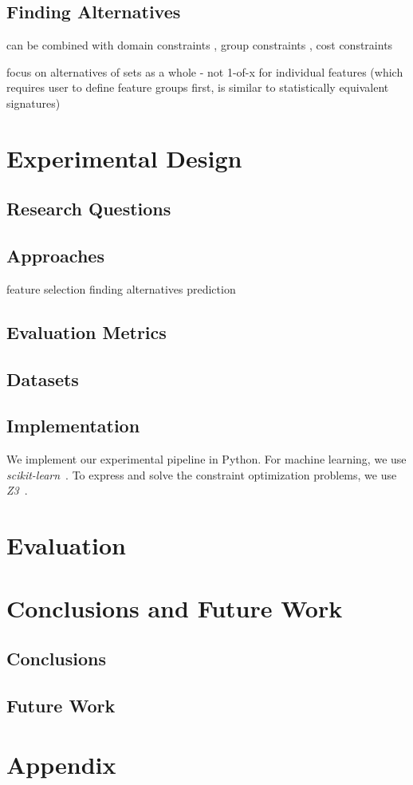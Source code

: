 \documentclass{article}
\begin{document}
\subsection{Finding Alternatives}

can be combined with domain constraints \cite{groves2015toward}, group constraints \cite{yuan2006model}, cost constraints \cite{paclik2002feature}

focus on alternatives of sets as a whole - not 1-of-x for individual features (which requires user to define feature groups first, is similar to statistically equivalent signatures)

\section{Experimental Design}
\label{sec:experimental-design}

\subsection{Research Questions}

\subsection{Approaches}

feature selection
finding alternatives
prediction

\subsection{Evaluation Metrics}

\subsection{Datasets}

\subsection{Implementation}

We implement our experimental pipeline in Python.
For machine learning, we use \emph{scikit-learn}~\cite{pedregosa2011scikit-learn}.
To express and solve the constraint optimization problems, we use \emph{Z3}~\cite{deMoura2008z3}.

\section{Evaluation}
\label{sec:evaluation}

\section{Conclusions and Future Work}
\label{sec:conclusion}

\subsection{Conclusions}

\subsection{Future Work}

\printbibliography

\appendix

\section{Appendix}
\label{sec:appendix}
\end{document}
